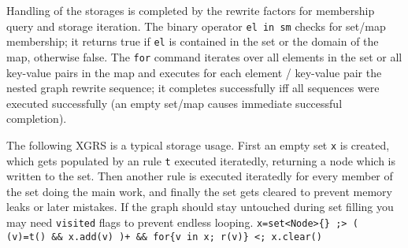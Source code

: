 \noindent Handling of the storages is completed by the rewrite factors for membership query and storage iteration.
The binary operator \texttt{el in sm} checks for set/map membership; it returns true if \texttt{el} is contained in the set or the domain of the map, otherwise false.
The \texttt{for} command iterates over all elements in the set or all key-value pairs in the map and executes for each element / key-value pair the nested graph rewrite sequence; it completes successfully iff all sequences were executed successfully (an empty set/map causes immediate successful completion).

\begin{example}
The following XGRS is a typical storage usage.
First an empty set \texttt{x} is created, which gets populated by an rule \texttt{t} executed iteratedly, returning a node which is written to the set.
Then another rule is executed iteratedly for every member of the set doing the main work, and finally the set gets cleared to prevent memory leaks or later mistakes.
If the graph should stay untouched during set filling you may need \texttt{visited} flags to prevent endless looping.
\verb#x=set<Node>{} ;> ( (v)=t() && x.add(v) )+ && for{v in x; r(v)} <; x.clear()#
\end{example}

